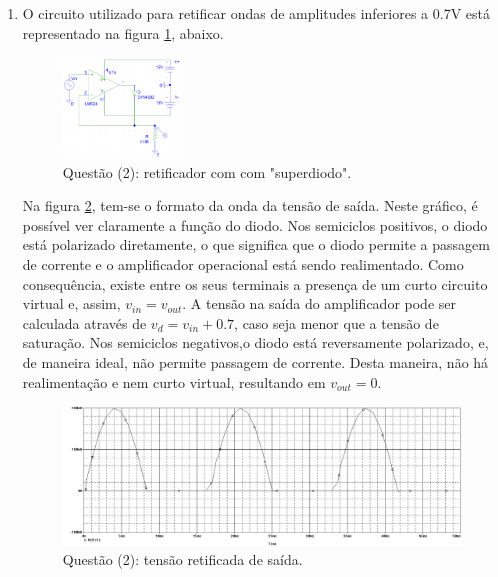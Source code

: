 \documentclass[12pt, a4paper]{article}
\begin{document}
\begin{enumerate}
            \item O circuito utilizado para retificar ondas de amplitudes inferiores a 0.7V está representado na figura \ref{circ22}, abaixo.
            
            \begin{figure}[h!] 
                \centering
                \includegraphics[width=0.30\textwidth]{circ22}
                \caption{Questão (2): retificador com com "superdiodo".}        
                \label{circ22}
            \end{figure}
            
            Na figura \ref{graf22}, tem-se o formato da onda da tensão de saída. Neste gráfico, é possível ver claramente a função do diodo. Nos semiciclos positivos, o diodo está polarizado diretamente, o que significa que o diodo permite a passagem de corrente e o amplificador operacional está sendo realimentado. Como consequência, existe entre os seus terminais a presença de um curto circuito virtual e, assim, \(v_{in} = v_{out}\). A tensão na saída do amplificador pode ser calculada através de \(v_d = v_{in} +0.7\), caso seja menor que a tensão de saturação. Nos semiciclos negativos,o diodo está reversamente polarizado, e, de maneira ideal, não permite passagem de corrente. Desta maneira, não há realimentação e nem curto virtual, resultando em \(v_{out} = 0\).
            
            \begin{figure}[h!] 
                \centering
                \includegraphics[width=1\textwidth]{graf22}
                \caption{Questão (2): tensão retificada de saída.}        
                \label{graf22}
            \end{figure}


\end{enumerate}
\end{document}
